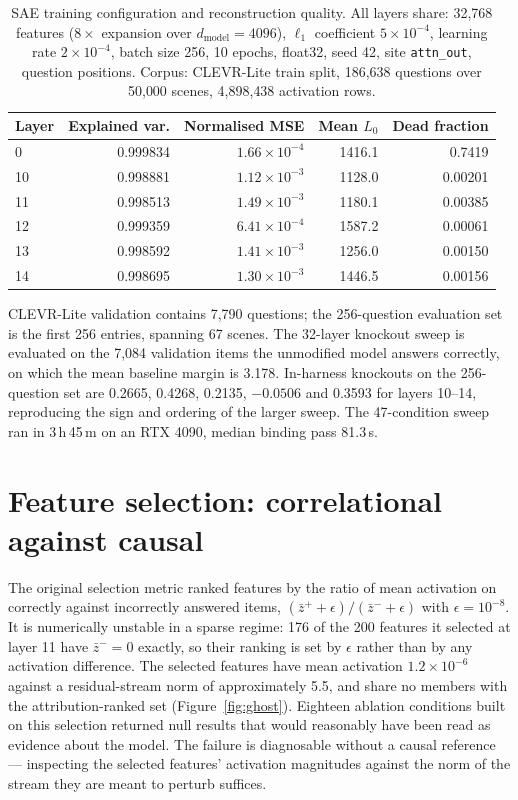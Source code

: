 \documentclass[11pt,a4paper]{article}
\begin{document}
\begin{table}[h]
  \centering
  \caption{SAE training configuration and reconstruction quality. All layers
  share: 32{,}768 features ($8\times$ expansion over $d_{\text{model}} = 4096$),
  $\ell_1$ coefficient $5 \times 10^{-4}$, learning rate $2 \times 10^{-4}$,
  batch size 256, 10 epochs, float32, seed 42, site \texttt{attn\_out}, question
  positions. Corpus: CLEVR-Lite train split, 186{,}638 questions over 50{,}000
  scenes, 4{,}898{,}438 activation rows.}
  \label{tab:sae}
  \begin{tabular}{lrrrr}
    \toprule
    Layer & Explained var. & Normalised MSE & Mean $L_0$ & Dead fraction \\
    \midrule
    0  & 0.999834 & $1.66 \times 10^{-4}$ & 1416.1 & 0.7419 \\
    10 & 0.998881 & $1.12 \times 10^{-3}$ & 1128.0 & 0.00201 \\
    11 & 0.998513 & $1.49 \times 10^{-3}$ & 1180.1 & 0.00385 \\
    12 & 0.999359 & $6.41 \times 10^{-4}$ & 1587.2 & 0.00061 \\
    13 & 0.998592 & $1.41 \times 10^{-3}$ & 1256.0 & 0.00150 \\
    14 & 0.998695 & $1.30 \times 10^{-3}$ & 1446.5 & 0.00156 \\
    \bottomrule
  \end{tabular}
\end{table}

CLEVR-Lite validation contains 7{,}790 questions; the 256-question evaluation
set is the first 256 entries, spanning 67 scenes. The 32-layer knockout sweep is
evaluated on the 7{,}084 validation items the unmodified model answers
correctly, on which the mean baseline margin is 3.178. In-harness knockouts on
the 256-question set are 0.2665, 0.4268, 0.2135, $-0.0506$ and 0.3593 for layers
10--14, reproducing the sign and ordering of the larger sweep. The 47-condition
sweep ran in 3\,h\,45\,m on an RTX 4090, median binding pass 81.3\,s.

\section{Feature selection: correlational against causal}

The original selection metric ranked features by the ratio of mean activation on
correctly against incorrectly answered items,
$(\bar{z}^{+} + \epsilon)/(\bar{z}^{-} + \epsilon)$ with $\epsilon = 10^{-8}$.
It is numerically unstable in a sparse regime: 176 of the 200 features it
selected at layer 11 have $\bar{z}^{-} = 0$ exactly, so their ranking is set by
$\epsilon$ rather than by any activation difference. The selected features have
mean activation $1.2 \times 10^{-6}$ against a residual-stream norm of
approximately 5.5, and share no members with the attribution-ranked set
(Figure~\ref{fig:ghost}). Eighteen ablation conditions built on this selection
returned null results that would reasonably have been read as evidence about the
model. The failure is diagnosable without a causal reference --- inspecting the
selected features' activation magnitudes against the norm of the stream they are
meant to perturb suffices.
\end{document}
